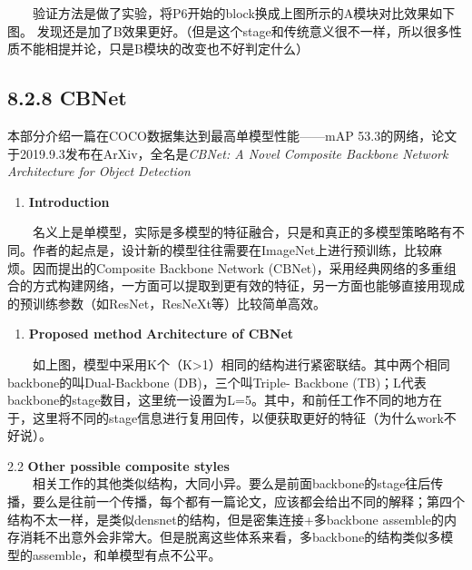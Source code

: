   验证方法是做了实验，将P6开始的block换成上图所示的A模块对比效果如下图。
发现还是加了B效果更好。（但是这个stage和传统意义很不一样，所以很多性质不能相提并论，只是B模块的改变也不好判定什么）

\subsection{8.2.8 CBNet}\label{cbnet}

本部分介绍一篇在COCO数据集达到最高单模型性能------mAP
53.3的网络，论文于2019.9.3发布在ArXiv，全名是\emph{CBNet: A Novel
Composite Backbone Network Architecture for Object Detection}

\begin{enumerate}
\def\labelenumi{\arabic{enumi}.}
\item
  \textbf{Introduction}
\end{enumerate}

  名义上是单模型，实际是多模型的特征融合，只是和真正的多模型策略略有不同。作者的起点是，设计新的模型往往需要在ImageNet上进行预训练，比较麻烦。因而提出的Composite
Backbone Network
(CBNet)，采用经典网络的多重组合的方式构建网络，一方面可以提取到更有效的特征，另一方面也能够直接用现成的预训练参数（如ResNet，ResNeXt等）比较简单高效。

\begin{enumerate}
\def\labelenumi{\arabic{enumi}.}
\setcounter{enumi}{1}
\item
  \textbf{Proposed method} %
  \textbf{Architecture of CBNet}\\
\end{enumerate}

  如上图，模型中采用K个（K\textgreater{}1）相同的结构进行紧密联结。其中两个相同backbone的叫Dual-Backbone
(DB)，三个叫Triple- Backbone
(TB)；L代表backbone的stage数目，这里统一设置为L=5。其中，和前任工作不同的地方在于，这里将不同的stage信息进行复用回传，以便获取更好的特征（为什么work不好说）。

2.2 \textbf{Other possible composite styles}\\

  相关工作的其他类似结构，大同小异。要么是前面backbone的stage往后传播，要么是往前一个传播，每个都有一篇论文，应该都会给出不同的解释；第四个结构不太一样，是类似densnet的结构，但是密集连接+多backbone
assemble的内存消耗不出意外会非常大。但是脱离这些体系来看，多backbone的结构类似多模型的assemble，和单模型有点不公平。

